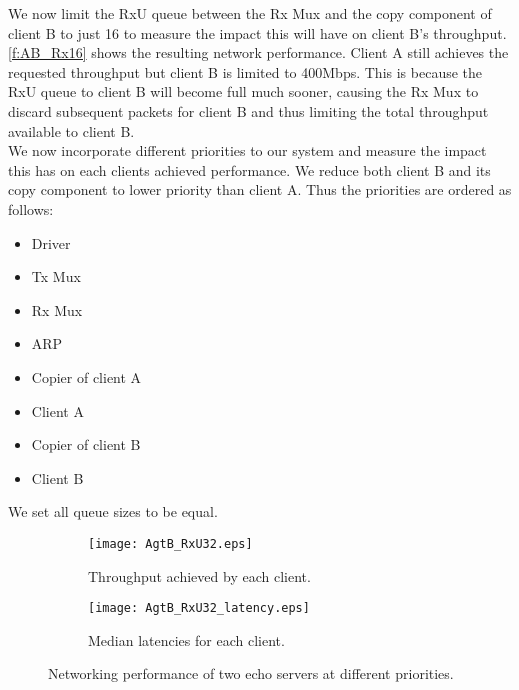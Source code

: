 We now limit the RxU queue between the Rx Mux and the copy component of client B to just 16 to measure 
the impact this will have on client B's throughput. \autoref{f:AB_Rx16} shows the resulting network performance.
Client A still achieves the requested throughput but client B is limited to 400Mbps. This is because the RxU queue
to client B will become full much sooner, causing the Rx Mux to discard subsequent packets for client B and thus
limiting the total throughput available to client B.\\

We now incorporate different priorities to our system and measure the impact this has on each clients
achieved performance. We reduce both client B and its copy component to lower priority than client A. 
Thus the priorities are ordered as follows:\\ 

\begin{minipage}{\textwidth}
\begin{itemize}
    \item[7.] Driver
    \item[6.] Tx Mux
    \item[5.] Rx Mux
    \item[4.] ARP
    \item[4.] Copier of client A
    \item[3.] Client A
    \item[2.] Copier of client B
    \item[1.] Client B
\end{itemize}

\end{minipage}

We set all queue sizes to be equal. 

\noindent\begin{figure}[H]
    \centering
	\begin{multicols}{2}
		\begin{subfigure}[b]{0.45\textwidth}
        \centering
        \texttt{[image: AgtB\_RxU32.eps]}
        \caption{Throughput achieved by each client.}
        \label{f:AgtB_RxU32_xput}
    \end{subfigure}\qquad
    \begin{subfigure}[b]{0.45\textwidth}
        \vspace{39pt}
        \centering
        \texttt{[image: AgtB\_RxU32\_latency.eps]}
        \caption{Median latencies for each client.}
        \label{f:AgtB_RxU32_latency}
    \end{subfigure}
\end{multicols}
\caption{Networking performance of two echo servers at different priorities.}
\label{f:AgtB_RxU32}
\end{figure}

